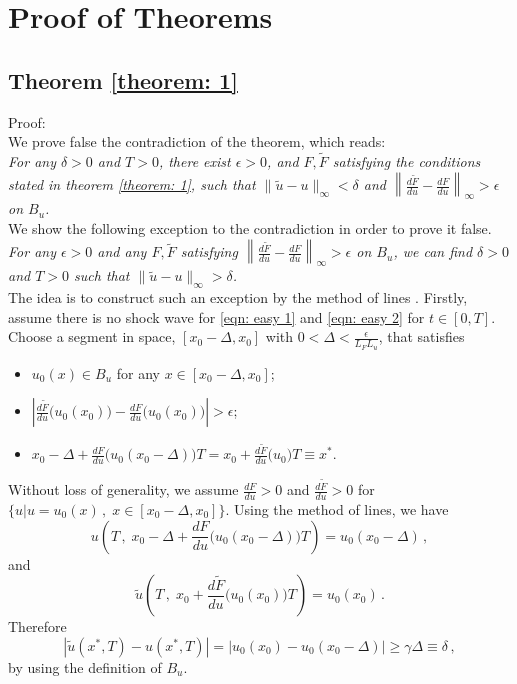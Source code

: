 \chapter{Proof of Theorems}

\section{Theorem \ref{theorem: 1}}
\label{proof 1}
Proof: \\
We prove false the contradiction of the theorem, which reads:\\
\emph{For any $\delta>0$ and $T>0$, there exist $\epsilon > 0$, and 
$F, \tilde{F}$ satisfying the conditions stated
in theorem \ref{theorem: 1}, such that $\|\tilde{u} - u\|_{\infty} < \delta$ and 
$\left\| \frac{d\tilde{F}}{du} - \frac{dF}{du} \right\|_\infty > \epsilon$ on $B_u$.}\\

We show the following exception to the contradiction in order to prove it false.\\
\emph{For any $\epsilon >0$ and any $F,\tilde{F}$ satisfying $\left\|\frac{d\tilde{F}}{du} - \frac{dF}{du}\right\|_{\infty} > \epsilon$
on $B_u$, we can find $\delta >0$ and $T>0$ such that $\|\tilde{u} - u\|_\infty > \delta$.
}\\

The idea is to construct such an exception by the method of lines \cite{method of lines}.
Firstly, assume there is no shock wave for \eqref{eqn: easy 1} and \eqref{eqn: easy 2} for $t\in[0,T]$. 
Choose a segment in space, $[x_0-\Delta, x_0]$ with $0< \Delta< \frac{\epsilon}{L_{F} L_{u}}$, that satisfies 
\begin{itemize}
    \item $u_0(x) \in B_u$ for any $x\in [x_0-\Delta, x_0]$;
    \item $\left| \frac{d\tilde{F}}{du}\big(u_0(x_0)\big) - \frac{dF}{du} \big(u_0(x_0)\big) \right| > \epsilon$;
    \item $x_0 - \Delta + \frac{dF}{du}\big( u_0(x_0 - \Delta) \big) T = x_0 + \frac{d\tilde{F}}{du}\big( u_0 \big)T \equiv x^*$.
\end{itemize}
Without loss of generality, we assume $\frac{dF}{du} >0$ and $\frac{d\tilde{F}}{du}>0$ for $\big\{u \big|u=u_0(x)\,,\; x\in[x_0-\Delta, x_0]\big\}$.
Using the method of lines, we have
$$u\left(T\,,\; x_0-\Delta +\frac{dF}{du}\big( u_0(x_0-\Delta) \big)T  \right) = u_0(x_0 -\Delta)\,,$$ and
$$\tilde{u}\left(T\,,\; x_0+\frac{d\tilde{F}}{du}\big( u_0(x_0) \big)T  \right) = u_0(x_0 )\,.$$
Therefore
$$
    \left| \tilde{u}(x^*, T) - u(x^*, T) \right| = \left| u_0(x_0) - u_0(x_0-\Delta) \right| \ge \gamma \Delta \equiv \delta\,,
$$
by using the definition of $B_u$.\\

